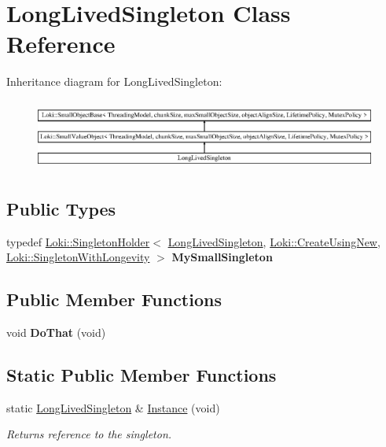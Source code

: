 \hypertarget{classLongLivedSingleton}{}\section{Long\+Lived\+Singleton Class Reference}
\label{classLongLivedSingleton}
Inheritance diagram for Long\+Lived\+Singleton\+:\begin{figure}[H]
\begin{center}
\leavevmode
\includegraphics[height=2.349650cm]{classLongLivedSingleton}
\end{center}
\end{figure}
\subsection*{Public Types}
\begin{DoxyCompactItemize}
\item 
\hypertarget{classLongLivedSingleton_a1839bcc9f65d6634f5196e640ab6e519}{}typedef \hyperlink{classLoki_1_1SingletonHolder}{Loki\+::\+Singleton\+Holder}$<$ \hyperlink{classLongLivedSingleton}{Long\+Lived\+Singleton}, \hyperlink{structLoki_1_1CreateUsingNew}{Loki\+::\+Create\+Using\+New}, \hyperlink{classLoki_1_1SingletonWithLongevity}{Loki\+::\+Singleton\+With\+Longevity} $>$ {\bfseries My\+Small\+Singleton}\label{classLongLivedSingleton_a1839bcc9f65d6634f5196e640ab6e519}

\end{DoxyCompactItemize}
\subsection*{Public Member Functions}
\begin{DoxyCompactItemize}
\item 
\hypertarget{classLongLivedSingleton_a29e2b3f2daa44ae218c3282b2ae8e6ae}{}void {\bfseries Do\+That} (void)\label{classLongLivedSingleton_a29e2b3f2daa44ae218c3282b2ae8e6ae}

\end{DoxyCompactItemize}
\subsection*{Static Public Member Functions}
\begin{DoxyCompactItemize}
\item 
\hypertarget{classLongLivedSingleton_ac10bb7c1621c2b2e16f1e9eeb63beda1}{}static \hyperlink{classLongLivedSingleton}{Long\+Lived\+Singleton} \& \hyperlink{classLongLivedSingleton_ac10bb7c1621c2b2e16f1e9eeb63beda1}{Instance} (void)\label{classLongLivedSingleton_ac10bb7c1621c2b2e16f1e9eeb63beda1}

\begin{DoxyCompactList}\small\item\em Returns reference to the singleton. \end{DoxyCompactList}\end{DoxyCompactItemize}
